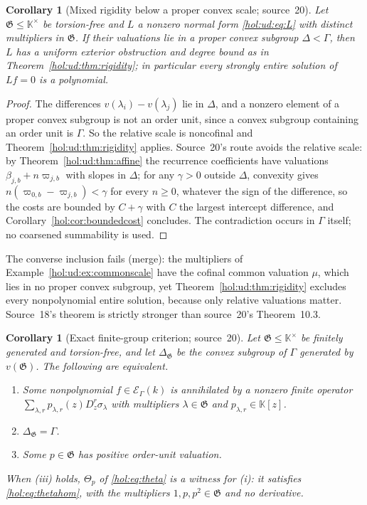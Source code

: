 \documentclass[11pt]{article}
\numberwithin{equation}{section}
\newtheorem{corollary}[theorem]{Corollary}
\theoremstyle{definition}
\theoremstyle{remark}
\newcommand{\KK}{\mathbb K}
\newcommand{\EK}{\mathcal E_\Gamma(k)}
\begin{document}
\begin{corollary}[Mixed rigidity below a proper convex scale; source~20]
\label{hol:rc:cor:convex}
Let $\mathfrak G\le\KK^\times$ be torsion-free and $L$ a nonzero normal form
\eqref{hol:ud:eq:L} with distinct multipliers in $\mathfrak G$. If their
valuations lie in a proper convex subgroup $\Delta<\Gamma$, then $L$ has a
uniform exterior obstruction and degree bound as in
Theorem~\ref{hol:ud:thm:rigidity}; in particular every strongly entire
solution of $Lf=0$ is a polynomial.
\end{corollary}

\begin{proof}
The differences $v(\lambda_i)-v(\lambda_j)$ lie in $\Delta$, and a nonzero
element of a proper convex subgroup is not an order unit, since a convex
subgroup containing an order unit is $\Gamma$. So the relative scale is
noncofinal and Theorem~\ref{hol:ud:thm:rigidity} applies. Source~20's route
avoids the relative scale: by Theorem~\ref{hol:ud:thm:affine} the recurrence
coefficients have valuations $\beta_{j,b}+n\varpi_{j,b}$ with slopes in
$\Delta$; for any $\gamma>0$ outside $\Delta$, convexity gives
$n(\varpi_{0,b}-\varpi_{j,b})<\gamma$ for every $n\ge0$, whatever the sign of
the difference, so the costs are bounded by $C+\gamma$ with $C$ the largest
intercept difference, and Corollary~\ref{hol:cor:boundedcost} concludes. The
contradiction occurs in $\Gamma$ itself; no coarsened summability is used.
\end{proof}

The converse inclusion fails (merge): the multipliers of
Example~\ref{hol:ud:ex:commonscale} have the cofinal common valuation $\mu$,
which lies in no proper convex subgroup, yet
Theorem~\ref{hol:ud:thm:rigidity} excludes every nonpolynomial entire solution,
because only relative valuations matter. Source~18's theorem is strictly
stronger than source~20's Theorem~10.3.

\begin{corollary}[Exact finite-group criterion; source~20]
\label{hol:rc:cor:finitegroup}
Let $\mathfrak G\le\KK^\times$ be finitely generated and torsion-free, and let
$\Delta_{\mathfrak G}$ be the convex subgroup of $\Gamma$ generated by
$v(\mathfrak G)$. The following are equivalent.
\begin{enumerate}[label=\textup{(\roman*)}]
\item Some nonpolynomial $f\in\EK$ is annihilated by a nonzero finite operator
$\sum_{\lambda,r}p_{\lambda,r}(z)D_z^r\sigma_\lambda$ with multipliers
$\lambda\in\mathfrak G$ and $p_{\lambda,r}\in\KK[z]$.
\item $\Delta_{\mathfrak G}=\Gamma$.
\item Some $p\in\mathfrak G$ has positive order-unit valuation.
\end{enumerate}
When \textup{(iii)} holds, $\Theta_p$ of \eqref{hol:eq:theta} is a witness for
\textup{(i)}: it satisfies \eqref{hol:eq:thetahom}, with the multipliers
$1,p,p^2\in\mathfrak G$ and no derivative.
\end{corollary}
\end{document}
